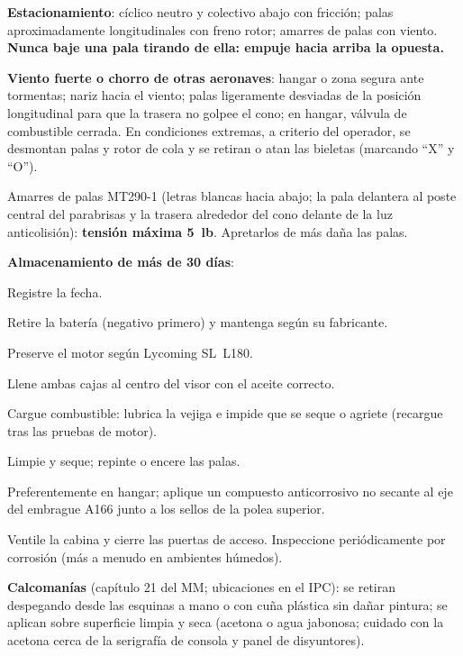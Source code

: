 \textbf{Estacionamiento}: cíclico neutro y colectivo abajo con fricción; palas aproximadamente longitudinales con freno rotor; amarres de palas con viento. \textbf{Nunca baje una pala tirando de ella: empuje hacia arriba la opuesta.}

\textbf{Viento fuerte o chorro de otras aeronaves}: hangar o zona segura ante tormentas; nariz hacia el viento; palas ligeramente desviadas de la posición longitudinal para que la trasera no golpee el cono; en hangar, válvula de combustible cerrada. En condiciones extremas, a criterio del operador, se desmontan palas y rotor de cola y se retiran o atan las bieletas (marcando ``X'' y ``O'').

\begin{precaucion}
Amarres de palas MT290-1 (letras blancas hacia abajo; la pala delantera al poste central del parabrisas y la trasera alrededor del cono delante de la luz anticolisión): \textbf{tensión máxima 5~lb}. Apretarlos de más daña las palas.
\end{precaucion}

\textbf{Almacenamiento de más de 30 días}:
\begin{pasos}
\item Registre la fecha.
\item Retire la batería (negativo primero) y mantenga según su fabricante.
\item Preserve el motor según Lycoming SL~L180.
\item Llene ambas cajas al centro del visor con el aceite correcto.
\item Cargue combustible: lubrica la vejiga e impide que se seque o agriete (recargue tras las pruebas de motor).
\item Limpie y seque; repinte o encere las palas.
\item Preferentemente en hangar; aplique un compuesto anticorrosivo no secante al eje del embrague A166 junto a los sellos de la polea superior.
\item Ventile la cabina y cierre las puertas de acceso. Inspeccione periódicamente por corrosión (más a menudo en ambientes húmedos).
\end{pasos}

\textbf{Calcomanías} (capítulo 21 del MM; ubicaciones en el IPC): se retiran despegando desde las esquinas a mano o con cuña plástica sin dañar pintura; se aplican sobre superficie limpia y seca (acetona o agua jabonosa; cuidado con la acetona cerca de la serigrafía de consola y panel de disyuntores).

